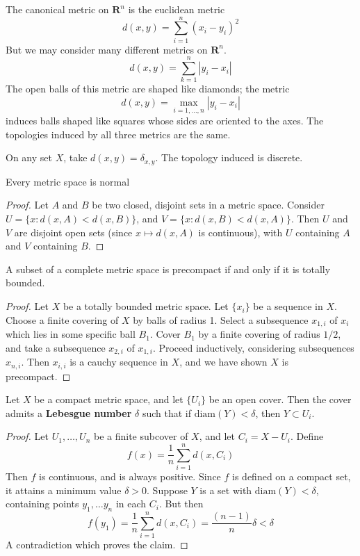 \begin{example}
    The canonical metric on $\mathbf{R}^n$ is the euclidean metric
    \[ d(x,y) = \sum_{i = 1}^n (x_i - y_i)^2 \]
    But we may consider many different metrics on $\mathbf{R}^n$.
    \[ d(x,y) = \sum_{k = 1}^n |y_i - x_i| \]
    The open balls of this metric are shaped like diamonds; the metric
    \[ d(x,y) = \max_{i = 1,\dots,n} |y_i - x_i| \]
    induces balls shaped like squares whose sides are oriented to the axes. The topologies induced by all three metrics are the same.
\end{example}

\begin{example}
    On any set $X$, take $d(x,y) = \delta_{x,y}$. The topology induced is discrete.
\end{example}

\begin{theorem}
    Every metric space is normal
\end{theorem}
\begin{proof}
    Let $A$ and $B$ be two closed, disjoint sets in a metric space. Consider $U = \{ x : d(x,A) < d(x,B) \}$, and $V = \{ x : d(x,B) < d(x,A) \}$. Then $U$ and $V$ are disjoint open sets (since $x \mapsto d(x,A)$ is continuous), with $U$ containing $A$ and $V$ containing $B$.
\end{proof}

\begin{theorem}
    A subset of a complete metric space is precompact if and only if it is totally bounded.
\end{theorem}
\begin{proof}
    Let $X$ be a totally bounded metric space. Let $\{ x_i \}$ be a sequence in $X$. Choose a finite covering of $X$ by balls of radius 1. Select a subsequence $x_{1,i}$ of $x_i$ which lies in some specific ball $B_1$. Cover $B_1$ by a finite covering of radius $1/2$, and take a subsequence $x_{2,i}$ of $x_{1,i}$. Proceed inductively, considering subsequences $x_{n,i}$. Then $x_{i,i}$ is a cauchy sequence in $X$, and we have shown $X$ is precompact.
\end{proof}

\begin{theorem}
    Let $X$ be a compact metric space, and let $\{ U_i \}$ be an open cover. Then the cover admits a {\bf Lebesgue number} $\delta$ such that if $\text{diam}(Y) < \delta$, then $Y \subset U_i$.
\end{theorem}
\begin{proof}
    Let $U_1, \dots, U_n$ be a finite subcover of $X$, and let $C_i = X - U_i$. Define
    \[ f(x) = \frac{1}{n} \sum_{i = 1}^n d(x,C_i) \]
    Then $f$ is continuous, and is always positive. Since $f$ is defined on a compact set, it attains a minimum value $\delta > 0$. Suppose $Y$ is a set with $\text{diam}(Y) < \delta$, containing points $y_1, \dots y_n$ in each $C_i$. But then
    \[ f(y_1) = \frac{1}{n} \sum_{i = 1}^n d(x,C_i) = \frac{(n-1)}{n} \delta < \delta \]
    A contradiction which proves the claim.
\end{proof}







